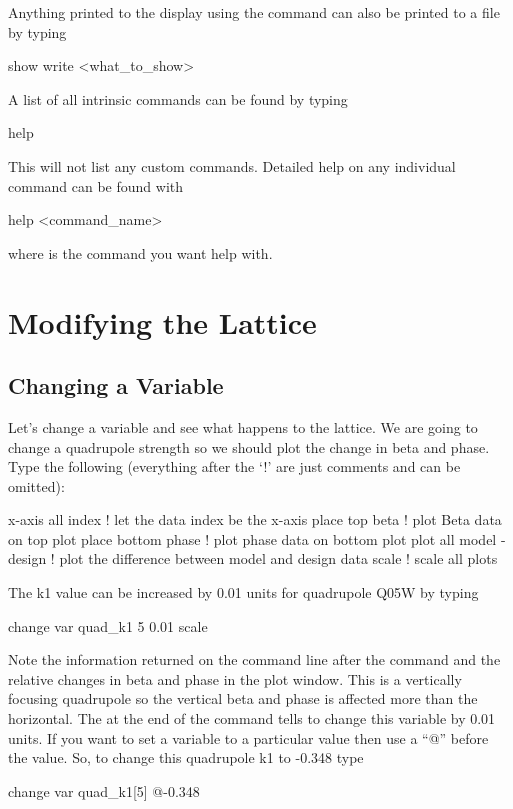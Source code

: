 Anything printed to the display using the  command can also
be printed to a file by typing
\begin{example}
  show write <what_to_show>
\end{example}

A list of all intrinsic  commands can be found by typing
\begin{example}
  help
\end{example}
This will not list any custom commands. Detailed help on any
individual command can be found with
\begin{example}
  help <command\_name>
\end{example}
where  is the command you want help with.

\section{Modifying the Lattice}
\label{s:modify_lattice}

\subsection{Changing a Variable}
\label{ss:change_variable}

Let's change a variable and see what happens to the lattice. We are going to
change a quadrupole strength so we should plot the change in beta and phase.
Type the following (everything after the `!' are just comments and can be
omitted):
\begin{example}
  x-axis all index        ! let the data index be the x-axis
  place top beta          ! plot Beta data on top plot
  place bottom phase      ! plot phase data on bottom plot
  plot all model - design ! plot the difference between model and design data
  scale                   ! scale all plots
\end{example}

The k1 value can be increased by 0.01 units for quadrupole Q05W by typing
\begin{example}
  change var quad\_k1 5 0.01
  scale
\end{example}
Note the information returned on the command line after the command
and the relative changes in beta and phase in the plot window. This is
a vertically focusing quadrupole so the vertical beta and phase is
affected more than the horizontal. The  at the end of the
command tells \tao to change this variable by 0.01 units. If you want
to set a variable to a particular value then use a ``@'' before the
value. So, to change this quadrupole k1 to -0.348 type
\begin{example}
  change var quad\_k1[5] @-0.348
\end{example}

